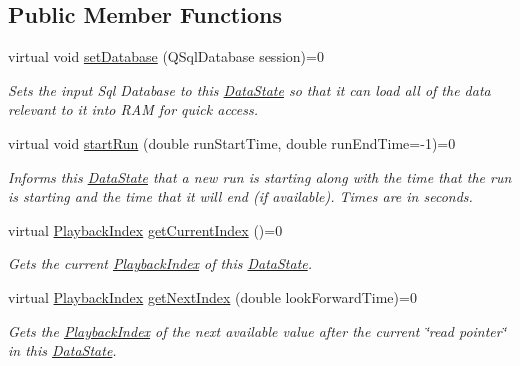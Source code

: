 \subsection*{Public Member Functions}
\begin{DoxyCompactItemize}
\item 
\hypertarget{class_picto_1_1_data_state_a7c0c6a6839540707d1a530690b6aae56}{virtual void \hyperlink{class_picto_1_1_data_state_a7c0c6a6839540707d1a530690b6aae56}{set\-Database} (Q\-Sql\-Database session)=0}\label{class_picto_1_1_data_state_a7c0c6a6839540707d1a530690b6aae56}

\begin{DoxyCompactList}\small\item\em Sets the input Sql Database to this \hyperlink{class_picto_1_1_data_state}{Data\-State} so that it can load all of the data relevant to it into R\-A\-M for quick access. \end{DoxyCompactList}\item 
virtual void \hyperlink{class_picto_1_1_data_state_a8338a5e0c034ccd190e2916e4d60a6e8}{start\-Run} (double run\-Start\-Time, double run\-End\-Time=-\/1)=0
\begin{DoxyCompactList}\small\item\em Informs this \hyperlink{class_picto_1_1_data_state}{Data\-State} that a new run is starting along with the time that the run is starting and the time that it will end (if available). Times are in seconds. \end{DoxyCompactList}\item 
virtual \hyperlink{struct_picto_1_1_playback_index}{Playback\-Index} \hyperlink{class_picto_1_1_data_state_aeb01a1209858dc99ce86d153aeda152a}{get\-Current\-Index} ()=0
\begin{DoxyCompactList}\small\item\em Gets the current \hyperlink{struct_picto_1_1_playback_index}{Playback\-Index} of this \hyperlink{class_picto_1_1_data_state}{Data\-State}. \end{DoxyCompactList}\item 
virtual \hyperlink{struct_picto_1_1_playback_index}{Playback\-Index} \hyperlink{class_picto_1_1_data_state_a959c083fdf897e2f8d75be596d9db8e0}{get\-Next\-Index} (double look\-Forward\-Time)=0
\begin{DoxyCompactList}\small\item\em Gets the \hyperlink{struct_picto_1_1_playback_index}{Playback\-Index} of the next available value after the current \char`\"{}read pointer\char`\"{} in this \hyperlink{class_picto_1_1_data_state}{Data\-State}. \end{DoxyCompactList}\item 

\end{DoxyCompactItemize}
